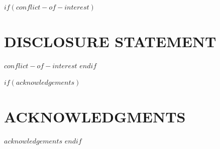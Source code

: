 $if(conflict-of-interest)$
\hypertarget{disclosure-statement}{%
\section*{DISCLOSURE STATEMENT}\label{disclosure-statement}}
$conflict-of-interest$
$endif$

$if(acknowledgements)$
\hypertarget{acknowledgments}{%
\section*{ACKNOWLEDGMENTS}\label{acknowledgments}}
$acknowledgements$
$endif$